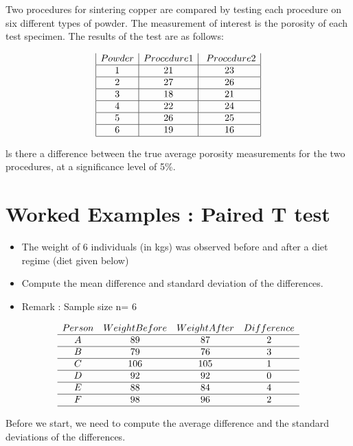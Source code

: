 \documentclass[]{report}
\begin{document}
Two procedures for sintering copper are compared by testing each procedure on six different types of powder. The measurement of interest is the porosity of each test specimen.
The results of the test are as follows:  

\[
\begin{array}{|c|c|c|}
Powder&Procedure 1& Procedure 2\\\hline
1&21&23\\\hline
2&27&26\\\hline
3&18&21\\\hline
4&22&24\\\hline
5&26&25\\\hline
6&19&16\\\hline
\end{array} 
\]




ls there a difference between the true average porosity measurements for the two procedures, at a significance level of 5\%.





\section{Worked Examples : Paired T test}
\begin{itemize}
\item The weight of 6 individuals (in kgs) was observed before and after a diet regime (diet given below)
\item Compute the mean difference and standard deviation of the differences.

\item Remark : Sample size n= 6
\end{itemize}

\[
\begin{array}{cccc}
Person&Weight Before&Weight After&Difference\\ \hline
A&89&87&2\\ \hline
B&79&76&3\\ \hline
C&106&105&1\\ \hline
D&92&92&0\\ \hline
E&88&84&4\\ \hline
F&98&96&2\\ \hline
\end{array} 
\]

Before we start, we need to compute the average difference and the standard deviations of the differences. 
\end{document}
